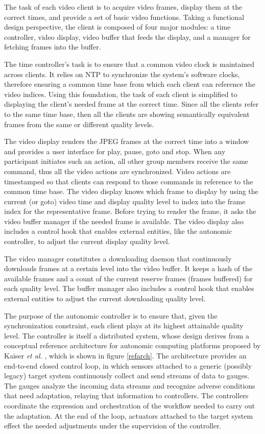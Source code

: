 \documentclass{sig-alternate}
\begin{document}

The task of each video client is to acquire video frames, display them
at the correct times, and provide a set of basic video functions.
Taking a functional design perspective, the client is composed of four
major modules: a time controller, video display, video buffer that
feeds the display, and a manager for fetching frames into the buffer.

The time controller's task is to ensure that a common video clock is
maintained across clients.  It relies on NTP to synchronize the
system's software clocks, therefore ensuring a common time base from
which each client can reference the video indices.  Using this
foundation, the task of each client is simplified to displaying the
client's needed frame at the correct time.  Since all the clients
refer to the same time base, then all the clients are showing
semantically equivalent frames from the same or different quality
levels.

The video display renders the JPEG frames at the correct time into a
window and provides a user interface for play, pause, goto and stop.
When any participant initiates such an action, all other group members
receive the same command, thus all the video actions are synchronized.
Video actions are timestamped so that clients can respond to those
commands in reference to the common time base.  The video display
knows which frame to display by using the current (or goto) video time
and display quality level to index into the frame index for the
representative frame.  Before trying to render the frame, it asks the
video buffer manager if the needed frame is available.  The video
display also includes a control hook that enables external entities,
like the autonomic controller, to adjust the current display quality
level.

The video manager constitutes a downloading daemon that continuously
downloads frames at a certain level into the video buffer.  It keeps a
hash of the available frames and a count of the current reserve frames
(frames buffered) for each quality level.  The buffer manager also
includes a control hook that enables external entities to adjust the
current downloading quality level.


The purpose of the autonomic controller is to ensure that, given the
synchronization constraint, each client plays at its highest
attainable quality level.  The controller is itself a distributed
system, whose design derives from a conceptual reference architecture
for autonomic computing platforms proposed by Kaiser {\it et al.}
\cite{REFARCH}, which is shown in figure \ref{refarch}. The
architecture provides an end-to-end closed control loop, in which
sensors attached to a generic (possibly legacy) target system
continuously collect and send streams of data to gauges.  The gauges
analyze the incoming data streams and recognize adverse conditions
that need adaptation, relaying that information to controllers.  The
controllers coordinate the expression and orchestration of the
workflow needed to carry out the adaptation.  At the end of the loop,
actuators attached to the target system effect the needed adjustments
under the supervision of the controller.
\end{document}
